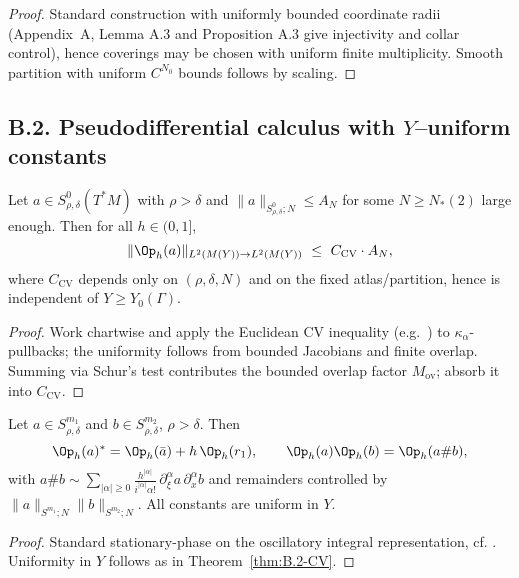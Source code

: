 \begin{proof}
Standard construction with uniformly bounded coordinate radii (Appendix~A, Lemma A.3 and
Proposition A.3 give injectivity and collar control), hence coverings may be chosen with
uniform finite multiplicity. Smooth partition with uniform $C^{N_0}$ bounds follows by scaling.
\end{proof}

\subsection*{B.2. Pseudodifferential calculus with $Y$–uniform constants}

\begin{theorem}\label{thm:B.2-CV}
Let $a\in S^0_{\rho,\delta}(T^*M)$ with $\rho> \delta$ and
$\|a\|_{S^0_{\rho,\delta};N}\le A_N$ for some $N\ge N_*(2)$ large enough.
Then for all $h\in(0,1]$,
\[
\|\Op_h(a)\|_{L^2(M(Y))\to L^2(M(Y))}\ \le\ C_{\mathrm{CV}}\cdot A_{N},
\]
where $C_{\mathrm{CV}}$ depends only on $(\rho,\delta,N)$ and on the fixed atlas/partition,
hence is independent of $Y\ge Y_0(\Gamma)$.
\end{theorem}

\begin{proof}
Work chartwise and apply the Euclidean CV inequality (e.g.\ \cite[Thm.~4.23]{Zworski}) to
$\kappa_\alpha$-pullbacks; the uniformity follows from bounded Jacobians and finite overlap.
Summing via Schur’s test contributes the bounded overlap factor $M_{\mathrm{ov}}$; absorb it into $C_{\mathrm{CV}}$.
\end{proof}

\begin{lemma}\label{lem:B.2-comp}
Let $a\in S^{m_1}_{\rho,\delta}$ and $b\in S^{m_2}_{\rho,\delta}$, $\rho>\delta$.
Then
\[
\Op_h(a)^*=\Op_h(\bar a)+h\,\Op_h(r_1),\qquad
\Op_h(a)\Op_h(b)=\Op_h(a\# b),
\]
with $a\# b \sim \sum_{|\alpha|\ge 0}\frac{h^{|\alpha|}}{i^{|\alpha|}\alpha!}\,
\partial_\xi^\alpha a\,\partial_x^\alpha b$ and remainders controlled by
$\|a\|_{S^{m_1};N}\|b\|_{S^{m_2};N}$. All constants are uniform in $Y$.
\end{lemma}

\begin{proof}
Standard stationary-phase on the oscillatory integral representation, cf.
\cite[Thm.~4.11, 4.14]{Zworski}. Uniformity in $Y$ follows as in
Theorem~\ref{thm:B.2-CV}.
\end{proof}

